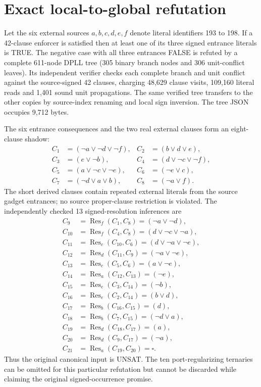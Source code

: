 \documentclass[10pt]{article}
\begin{document}
\section{Exact local-to-global refutation}
Let the six external sources $a,b,c,d,e,f$ denote literal identifiers 193 to 198. If a 42-clause enforcer is satisfied then at least one of its three signed entrance literals is TRUE. The negative case with all three entrances FALSE is refuted by a complete 611-node DPLL tree (305 binary branch nodes and 306 unit-conflict leaves). Its independent verifier checks each complete branch and unit conflict against the source-signed 42 clauses, charging 48,629 clause visits, 109,160 literal reads and 1,401 sound unit propagations. The same verified tree transfers to the other copies by source-index renaming and local sign inversion. The tree JSON occupies 9,712 bytes.

The six entrance consequences and the two real external clauses form an eight-clause shadow:
\begin{align*}
C_1&=(\neg a\vee\neg d\vee\neg f),&C_2&=(b\vee d\vee e),\\
C_3&=(e\vee\neg b),&C_4&=(d\vee\neg c\vee\neg f),\\
C_5&=(a\vee\neg c\vee\neg e),&C_6&=(\neg e\vee c),\\
C_7&=(\neg d\vee a\vee b),&C_8&=(\neg a\vee f).
\end{align*}
The short derived clauses contain repeated external literals from the source gadget entrances; no source proper-clause restriction is violated. The independently checked 13 signed-resolution inferences are
\begin{align*}
C_9 &=\operatorname{Res}_f(C_1,C_8)=(\neg a\vee\neg d),\\
C_{10}&=\operatorname{Res}_f(C_4,C_8)=(d\vee\neg c\vee\neg a),\\
C_{11}&=\operatorname{Res}_c(C_{10},C_6)=(d\vee\neg a\vee\neg e),\\
C_{12}&=\operatorname{Res}_d(C_{11},C_9)=(\neg a\vee\neg e),\\
C_{13}&=\operatorname{Res}_c(C_5,C_6)=(a\vee\neg e),\\
C_{14}&=\operatorname{Res}_a(C_{12},C_{13})=(\neg e),\\
C_{15}&=\operatorname{Res}_e(C_3,C_{14})=(\neg b),\\
C_{16}&=\operatorname{Res}_e(C_2,C_{14})=(b\vee d),\\
C_{17}&=\operatorname{Res}_b(C_{16},C_{15})=(d),\\
C_{18}&=\operatorname{Res}_b(C_7,C_{15})=(\neg d\vee a),\\
C_{19}&=\operatorname{Res}_d(C_{18},C_{17})=(a),\\
C_{20}&=\operatorname{Res}_d(C_9,C_{17})=(\neg a),\\
C_{21}&=\operatorname{Res}_a(C_{19},C_{20})=\square.
\end{align*}
Thus the original canonical input is UNSAT. The ten port-regularizing ternaries can be omitted for this particular refutation but cannot be discarded while claiming the original signed-occurrence promise.
\end{document}
